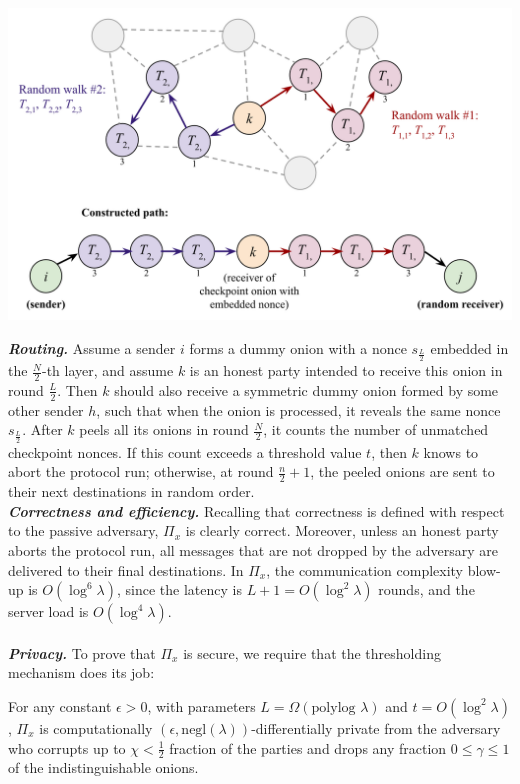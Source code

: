  \begin{center}
    \includegraphics[width=400pt]{template/figures/constructing-checkpoint-onion-path.png}
\end{center}
 
\textbf{\textit{Routing.}} Assume a sender $i$ forms a dummy onion with a nonce $s_{\frac{L}{2}}$ embedded in the $\frac{N}{2}$-th layer, and assume $k$ is an honest party intended to receive this onion in round $\frac{L}{2}$. Then $k$ should also receive a symmetric dummy onion formed by some other sender $h$, such that when the onion is processed, it reveals the same nonce $s_{\frac{L}{2}}$. After $k$ peels all its onions in round $\frac{N}{2}$, it counts the number of unmatched checkpoint nonces. If this count exceeds a threshold value $t$, then $k$ knows to abort the protocol run; otherwise, at round $\frac{n}{2} + 1$, the peeled onions are sent to their next destinations in random order.\\

\textbf{\textit{Correctness and efficiency.}} Recalling that correctness is defined with respect to the passive adversary, $\Pi_x$ is clearly correct. Moreover, unless an honest party aborts the protocol run, all messages that are not dropped by the adversary are delivered to their final destinations. In $\Pi_x$, the communication complexity blow-up is $O(\log^6 \lambda)$, since the latency is $L+1 = O(\log^2 \lambda)$ rounds, and the server load is $O(\log^4 \lambda)$.\\\\
\textbf{\textit{Privacy.}} To prove that $\Pi_x$ is secure, we require that the thresholding mechanism does its job:

\begin{theorem} \label{clm:active}
    For any constant $\epsilon > 0$, with parameters $L = \Omega(\text{polylog }\lambda)$ and $t = O(\log^2 \lambda)$, $\Pi_x$ is computationally $(\epsilon, \text{negl}(\lambda))$-differentially private from the adversary who corrupts up to $\chi < \frac{1}{2}$ fraction of the parties and drops any fraction $0 \leq \gamma \leq 1$ of the indistinguishable onions.\\
\end{theorem}

